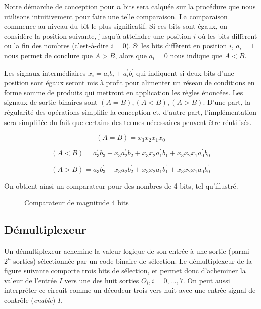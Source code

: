 \documentclass[11pt]{article}
\begin{document}
Notre démarche de conception pour \(n\) bits sera calquée sur la
procédure que nous utilisons intuitivement pour faire une telle
comparaison. La comparaison commence au niveau du bit le plus
significatif. Si ces bits sont égaux, on considère la position
suivante, jusqu'à atteindre une position \(i\) où les bits diffèrent
ou la fin des nombres (c'est-à-dire \(i=0\)). Si les bits diffèrent en
position \(i\), \(a_i = 1\) nous permet de conclure que \(A > B\),
alors que \(a_i = 0\) nous indique que \(A < B\).

Les signaux intermédiaires \(x_i = a_i b_i + a_i^\prime b_i^\prime\)
qui indiquent si deux bits d'une position sont égaux seront mis à
profit pour alimenter un réseau de conditions en forme somme de
produits qui mettront en application les règles énoncées. Les signaux
de sortie binaires sont \((A = B), (A < B), (A > B)\).  D'une part,
la régularité des opérations simplifie la conception et, d'autre part,
l'implémentation sera simplifiée du fait que certains des termes
nécessaires peuvent être réutilisés.

$$ (A = B) = x_3 x_2 x_1 x_0 $$ 

$$ (A < B) = a_3^\prime b_3 + x_3  a_2^\prime b_2  +  x_3 x_2  a_1^\prime b_1 +  x_3 x_2 x_1  a_0^\prime b_0 $$

$$ (A > B) = a_3 b_3^\prime + x_3  a_2 b_2^\prime  +  x_3 x_2  a_1 b_1^\prime +  x_3 x_2 x_1  a_0 b_0^\prime $$

On obtient ainsi un comparateur pour des nombres de 4 bits, tel qu'illustré.

\begin{figure}[htbp]
\centering

\caption{\label{fig:org5e1319a}Comparateur de magnitude 4 bits}
\end{figure}

\subsection{Démultiplexeur}
\label{sec:org0355aee}

Un démultiplexeur achemine la valeur logique de son entrée à une
sortie (parmi \(2^n\) sorties) sélectionnée par un code binaire de
sélection. Le démultiplexeur de la figure suivante comporte trois bits
de sélection, et permet donc d'acheminer la valeur de l'entrée \(I\)
vers une des huit sorties \(O_i, i = 0, \ldots, 7\). On peut aussi
interpréter ce circuit comme un décodeur trois-vers-huit avec une
entrée signal de contrôle (\emph{enable}) \(I\).
\end{document}
